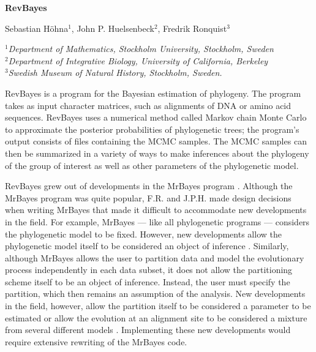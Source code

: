 \documentclass{article}
\begin{document}
\begin{center}

{\Large\bf RevBayes}

\bigskip

{\sc Sebastian H\"ohna$^{1}$, John P. Huelsenbeck$^{2}$, Fredrik Ronquist$^{3}$} \\

\bigskip

{\em
$\mbox{}^1$Department of Mathematics, Stockholm University, Stockholm, Sweden \\

$\mbox{}^2$Department of Integrative Biology, University of California, Berkeley\\

$\mbox{}^3$Swedish Museum of Natural History, Stockholm, Sweden. \\

}
\end{center}

\bigskip

\noindent RevBayes is a program for the Bayesian estimation of phylogeny. 
The program takes as input character matrices, such as alignments of DNA or amino acid sequences.
RevBayes uses a numerical method called Markov chain Monte Carlo \citep[MCMC;][]{metropolis53,hastings70} to approximate
the posterior probabilities of phylogenetic trees; the program's output consists of files containing the MCMC samples. 
The MCMC samples can then be summarized in a variety of ways to make inferences about the phylogeny of the group of interest
as well as other parameters of the phylogenetic model.

RevBayes grew out of developments in the MrBayes program \citep{huelsenbeck01c,ronquist03}.
Although the MrBayes program was quite popular, F.R. and J.P.H. made design decisions when writing MrBayes that made it difficult
to accommodate new developments in the field. For example, MrBayes --- like all phylogenetic programs --- considers the phylogenetic
model to be fixed. However, new developments allow the phylogenetic model itself to be considered an object of 
inference \citep[{\it e.g.},][]{huelsenbeck04d}. Similarly, although MrBayes allows the user to partition data and model the evolutionary
process independently in each data subset, it does not allow the partitioning scheme itself to be an object of inference. Instead,
the user must specify the partition, which then remains an assumption of the analysis. New developments in the field, however, allow
the partition itself to be considered a parameter to be estimated \citep{lartillot04,huelsenbeck06,huelsenbeck07b} or allow the
evolution at an alignment site to be considered a mixture from several different models \citep{pagel04,pagel05}. 
Implementing these new developments would require extensive rewriting of the MrBayes code. 
\end{document}
